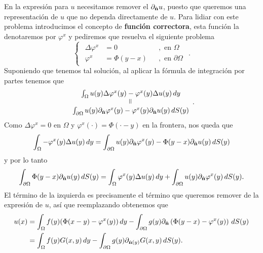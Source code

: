 \documentclass[../edp.tex]{subfiles}
\begin{document}
En la expresión para \(u\) necesitamos remover el \(\partial_{\hat{\textbf{n}}} u\), puesto
que queremos una representación de \(u\) que no dependa directamente de \(u\).
Para lidiar con este problema introducimos el concepto de \textbf{función
correctora}, esta función la denotaremos por \(\varphi^{x}\) y pediremos que
resuelva el siguiente problema
\begin{displaymath}\label{FC}
\begin{cases}
\begin{aligned}
	\Delta \varphi^{x} &= 0  &&, \text{ en } \Omega\\
	\varphi^{x} &= \Phi(y-x) &&, \text{ en } \partial\Omega
\end{aligned}
\end{cases}.
\tag{FC}
\end{displaymath}
Suponiendo que tenemos tal solución, al aplicar la fórmula de integración por
partes tenemos que
\begin{displaymath}
\begin{array}{cc}
	\int_{\Omega}
		u(y) \Delta\varphi^{x}(y) 
		-
		\varphi^{x}(y) \Delta u(y)
	\, dy
	\\
	\rotatebox{90}{=}
	\\
	\int_{\partial\Omega}
		u(y) \partial_{\n} \varphi^{x}(y) 
		-
		\varphi^{x}(y) \partial_{\n} u(y)
	\, dS(y)
\end{array}.
\end{displaymath}
Como \(\Delta\varphi^{x} = 0\) en \(\Omega\) y \(\varphi^{x}(\cdot) = 
\Phi(\cdot-y)\) en la frontera, nos queda que
\begin{displaymath}
	\int_{\Omega}
		- \varphi^{x}(y) \Delta u(y) \, dy
	=
	\int_{\partial\Omega}
		u(y) \partial_{\hat{\textbf{n}}} \varphi^{x}(y) 
		-
		\Phi(y-x) \partial_{\hat{\textbf{n}}} u(y)
	\, dS(y)
\end{displaymath}
y por lo tanto
\begin{displaymath}
	\int_{\partial\Omega}
		\Phi(y-x) \partial_{\hat{\textbf{n}}} u(y)
	\, dS(y)
	=
	\int_{\Omega}
		\varphi^{x}(y) \Delta u(y) \, dy
	+
	\int_{\partial\Omega}
		u(y) \partial_{\hat{\textbf{n}}} \varphi^{x}(y) 
	\, dS(y).
\end{displaymath}
El término de la izquierda es precisamente el término que queremos remover de la
expresión de \(u\), así que reemplazando obtenemos que
\begin{align*}\label{poisson:representacion}
	u(x)
	&=
	\int_{\Omega}
		f(y)
		(\Phi(x-y) - \varphi^{x}(y))
	\, dy
	-
	\int_{\partial\Omega}
		g(y) 
		\partial_{\hat{\textbf{n}}} \left(\Phi(y-x) - \varphi^{x}(y)\right)
	\, dS(y)
	\\&=
	\int_{\Omega}
		f(y) G(x,y) \, dy
	-
	\int_{\partial\Omega}
		g(y) \partial_{\hat{\textbf{n}}(y) } G(x,y) \, dS(y).
\end{align*}
\end{document}
